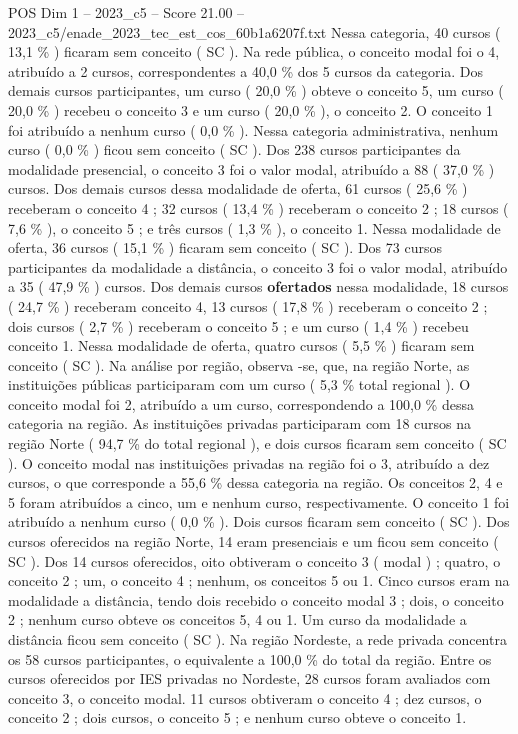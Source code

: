 \begin{textsample}{POS Dim 1 – 2023\_c5 – Score 21.00 – 2023\_c5/enade\_2023\_tec\_est\_cos\_60b1a6207f.txt}
Nessa categoria, 40 cursos ( 13,1 \% ) ficaram sem conceito ( SC ).
Na rede pública, o conceito modal foi o 4, atribuído a 2 cursos, correspondentes a 40,0 \% dos 5 cursos da categoria.
Dos demais cursos participantes, um curso ( 20,0 \% ) obteve o conceito 5, um curso ( 20,0 \% ) recebeu o conceito 3 e um curso ( 20,0 \% ), o conceito 2.
O conceito 1 foi atribuído a nenhum curso ( 0,0 \% ).
Nessa categoria administrativa, nenhum curso ( 0,0 \% ) ficou sem conceito ( SC ).
Dos 238 cursos participantes da modalidade presencial, o conceito 3 foi o valor modal, atribuído a 88 ( 37,0 \% ) cursos.
Dos demais cursos dessa modalidade de oferta, 61 cursos ( 25,6 \% ) receberam o conceito 4 ; 32 cursos ( 13,4 \% ) receberam o conceito 2 ; 18 cursos ( 7,6 \% ), o conceito 5 ; e três cursos ( 1,3 \% ), o conceito 1.
Nessa modalidade de oferta, 36 cursos ( 15,1 \% ) ficaram sem conceito ( SC ).
Dos 73 cursos participantes da modalidade a distância, o conceito 3 foi o valor modal, atribuído a 35 ( 47,9 \% ) cursos.
Dos demais cursos \textbf{ofertados} nessa modalidade, 18 cursos ( 24,7 \% ) receberam conceito 4, 13 cursos ( 17,8 \% ) receberam o conceito 2 ; dois cursos ( 2,7 \% ) receberam o conceito 5 ; e um curso ( 1,4 \% ) recebeu conceito 1.
Nessa modalidade de oferta, quatro cursos ( 5,5 \% ) ficaram sem conceito ( SC ).
Na análise por região, observa -se, que, na região Norte, as instituições públicas participaram com um curso ( 5,3 \% total regional ).
O conceito modal foi 2, atribuído a um curso, correspondendo a 100,0 \% dessa categoria na região.
As instituições privadas participaram com 18 cursos na região Norte ( 94,7 \% do total regional ), e dois cursos ficaram sem conceito ( SC ).
O conceito modal nas instituições privadas na região foi o 3, atribuído a dez cursos, o que corresponde a 55,6 \% dessa categoria na região.
Os conceitos 2, 4 e 5 foram atribuídos a cinco, um e nenhum curso, respectivamente.
O conceito 1 foi atribuído a nenhum curso ( 0,0 \% ).
Dois cursos ficaram sem conceito ( SC ).
Dos cursos oferecidos na região Norte, 14 eram presenciais e um ficou sem conceito ( SC ).
Dos 14 cursos oferecidos, oito obtiveram o conceito 3 ( modal ) ; quatro, o conceito 2 ; um, o conceito 4 ; nenhum, os conceitos 5 ou 1.
Cinco cursos eram na modalidade a distância, tendo dois recebido o conceito modal 3 ; dois, o conceito 2 ; nenhum curso obteve os conceitos 5, 4 ou 1.
Um curso da modalidade a distância ficou sem conceito ( SC ).
Na região Nordeste, a rede privada concentra os 58 cursos participantes, o equivalente a 100,0 \% do total da região.
Entre os cursos oferecidos por IES privadas no Nordeste, 28 cursos foram avaliados com conceito 3, o conceito modal. 11 cursos obtiveram o conceito 4 ; dez cursos, o conceito 2 ; dois cursos, o conceito 5 ; e nenhum curso obteve o conceito 1.

\end{textsample}
